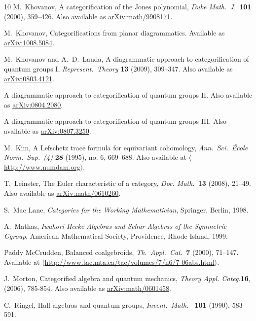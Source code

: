 \documentclass{article}
\begin{document}
\begin{thebibliography}{10}
M.\ Khovanov, A categorification of the Jones polynomial, 
\textsl{Duke Math.\ J.\ }{\bf 101} (2000), 359--426.  
Also available as \href{http://arxiv.org/abs/math/9908171}
{arXiv:math/9908171}.

M.\ Khovanov, Categorifications from planar diagrammatics.
Available as 
\href{http://arxiv.org/abs/1008.5084}{arXiv:1008.5084}.

M.\ Khovanov and A.\ D.\ Lauda, A diagrammatic approach to
categorification of quantum groups I, {\em Represent.\ Theory} {\bf
13} (2009), 309--347.  Also available as
\href{http://arxiv.org/abs/0803.4121}{arXiv:0803.4121}.

A diagrammatic approach to categorification of quantum groups II.
Also available as
\href{http://arxiv.org/abs/0804.2080}{arXiv:0804.2080}.

A diagrammatic approach to categorification of quantum groups III.
Also available as
\href{http://arxiv.org/abs/0807.3250}{arXiv:0807.3250}.

M.\ Kim, A Lefschetz trace formula for equivariant cohomology, {\em
Ann.\ Sci.\ \'Ecole Norm.\ Sup.\ (4) }{\bf 28} (1995), no. 6, 669--688.
Also available at
\href{http://www.numdam.org/numdam-bin/fitem?id=ASENS_1995_4_28_6_669_0}
{$\langle$http:/\!/www.numdam.org$\rangle$}.

T.\ Leinster, The Euler characteristic of a category, {\em
Doc. Math.\ }{\bf 13} (2008), 21--49.  Also available as
\href{http://arxiv.org/abs/math/0601458}
{arXiv:math/0610260}.

 S.\ Mac Lane, {\sl Categories for the
Working Mathematician}, Springer, Berlin, 1998.

A.\ Mathas, {\sl Iwahori-Hecke Algebras and Schur Algebras of the Symmetric 
Ggroup}, American Mathematical Society, Providence, Rhode Island, 1999.

Paddy McCrudden, Balanced coalgebroids,
\textsl{Th.\ Appl.\ Cat.\ }{\bf 7} (2000), 71--147. Available at
\hfill \break
\href{http://www.tac.mta.ca/tac/volumes/7/n6/7-06abs.html}
{$\langle$http:/\!/www.tac.mta.ca/tac/volumes/7/n6/7-06abs.html$\rangle$}.

J.\ Morton, Categorified algebra and quantum mechanics, {\em Theory
Appl. Categ.}{\bf 16}, (2006), 785-854.  Also available as
\href{http://arxiv.org/abs/math/0601458}
{arXiv:math/0601458}.

 C.\ Ringel, Hall algebras and quantum groups,
\textsl{Invent.\ Math.\ } {\bf 101} (1990), 583--591.


\end{thebibliography}
\end{document}
